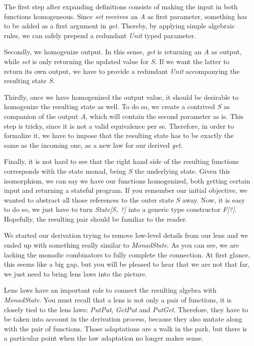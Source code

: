 \documentclass[a4paper]{article}
\begin{document}
The first step after expanding definitions consists of making the input in both
functions homogeneous. Since \emph{set} receives an \emph{A} as first parameter,
something has to be added as a first argument in \emph{get}. Thereby, by
applying simple algebraic rules, we can safely prepend a redundant \emph{Unit}
typed parameter.

Secondly, we homogenize output. In this sense, \emph{get} is returning an $A$ as
output, while \emph{set} is only returning the updated value for $S$. If we want
the latter to return its own output, we have to provide a redundant \emph{Unit}
accompanying the resulting state $S$.

Thirdly, once we have homogenized the output value, it should be desirable to
homogenize the resulting state as well. To do so, we create a contrived $S$ as
companion of the output $A$, which will contain the second parameter as is. This
step is tricky, since it is not a valid equivalence per se. Therefore, in order
to formalize it, we have to impose that the resulting state has to be exactly
the same as the incoming one, as a new law for our derived
\emph{get}.

Finally, it is not hard to see that the right hand side of the resulting
functions corresponds with the state monad, being $S$ the underlying state.
Given this isomorphism, we can say we have our functions homogenized, both
getting certain input and returning a stateful program. If you remember our
initial objective, we wanted to abstract all those references to the outer state
$S$ away. Now, it is easy to do so, we just have to turn \emph{State[S, ?]} into
a generic type constructor \emph{F[?]}. Hopefully, the resulting pair should be
familiar to the reader.

We started our derivation trying to remove low-level details from our lens and
we ended up with something really similar to \emph{MonadState}. As you can see,
we are lacking the monadic combinators to fully complete the connection. At
first glance, this seems like a big gap, but you will be pleased to hear that we
are not that far, we just need to bring lens laws into the picture.

Lens laws have an important role to connect the resulting algebra with
\emph{MonadState}. You must recall that a lens is not only a pair of functions,
it is closely tied to the lens laws: \emph{PutPut}, \emph{GetPut} and
\emph{PutGet}. Therefore, they have to be taken into account in the derivation
process, because they also mutate along with the pair of functions. Those
adaptations are a walk in the park, but there is a particular point when the law
adaptation no longer makes sense.
\end{document}
